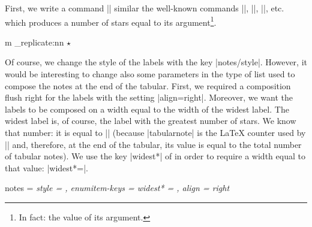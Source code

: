 \documentclass[dvipsnames]{article}%
\begin{document}
\medskip
First, we write a command |\stars| similar the well-known commands 
|\arabic|, |\alph|, |\Alph|, etc. which produces a number of stars equal to
its argument\footnote{In fact: the value of its argument.}.
\begin{Code}
\ExplSyntaxOn
\NewDocumentCommand { \emph{\stars} } { m }
  { \prg_replicate:nn { \value { #1 } } { \( \star \) } } 
\ExplSyntaxOff
\end{Code}
%
Of course, we change the style of the labels with the key |notes/style|.
However, it would be interesting to change also some parameters in the type of
list used to compose the notes at the end of the tabular.
First, we required a composition flush right for the labels with the setting
|align=right|.
Moreover, we want the labels to be composed on a width equal to the width of
the widest label. The widest label is, of course, the label with the greatest
number of stars. We know that number: it is equal to |\value{tabularnote}|
(because |tabularnote| is the LaTeX counter used by |\tabularnote| and,
therefore, at the end of the tabular, its value is equal to the total number
of tabular notes). We use the key |widest*| of  in order to
require a width equal to that value: |widest*=\value{tabularnote}|. 

\begin{Code}
\NiceMatrixOptions 
  {
    notes = 
     {
       \emph{style =  , 
       enumitem-keys = 
        { 
          widest* = \value{tabularnote} ,
          align = right 
        } }
     }
  }
\end{Code}
\end{document}
